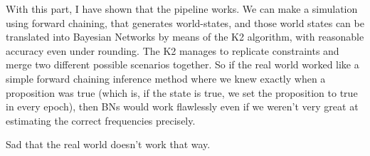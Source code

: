 With this part, I have shown that the pipeline works. We can make a simulation using forward chaining, that generates world-states, and those world states can be translated into Bayesian Networks by means of the K2 algorithm, with reasonable accuracy even under rounding. The K2 manages to replicate constraints and merge two different possible scenarios together. So if the real world worked like a simple forward chaining inference method where we knew exactly when a proposition was true (which is, if the state is true, we set the proposition to true in every epoch), then BNs would work flawlessly even if we weren't very great at estimating the correct frequencies precisely.

Sad that the real world doesn't work that way.





